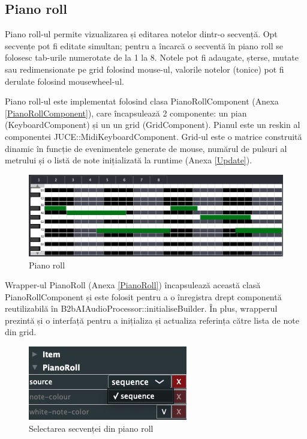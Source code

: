     \subsection{Piano roll}
        \noindent Piano roll-ul permite vizualizarea și editarea notelor dintr-o secvență. Opt secvențe pot fi editate simultan; pentru a încarcă o secventă în piano roll se folosesc tab-urile numerotate de la 1 la 8. Notele pot fi adaugate, șterse,  mutate sau redimensionate pe grid folosind mouse-ul, valorile notelor (tonice) pot fi derulate folosind mousewheel-ul. \par
        Piano roll-ul este implementat folosind clasa PianoRollComponent (Anexa \ref{PianoRollComponent}), care încapsulează 2 componente: un pian (KeyboardComponent) și un un grid (GridComponent). Pianul este un reskin al componentei JUCE::MidiKeyboardComponent. Grid-ul este o matrice construită dinamic în funcție de evenimentele generate de mouse, numărul de pulsuri al metrului și o listă de note inițializată la runtime (Anexa \ref{Update}). \par 
                \begin{figure}[H]
            \centering
            \includegraphics[scale=0.428]{images/pianoroll.jpeg}
            \caption{Piano roll}
            \label{fig:piano_rol}
        \end{figure}
        \noindent Wrapper-ul PianoRoll (Anexa \ref{PianoRoll}) încapsulează această clasă PianoRollComponent și este folosit pentru a o înregistra drept componentă reutilizabilă în B2bAIAudioProcessor::initialiseBuilder. În plus, wrapperul prezintă și o interfață pentru a inițializa și actualiza referința către lista de note din grid. \par
        
        \begin{figure}[H]
            \centering
            \includegraphics[scale=0.6]{images/interface.jpeg}
            \caption{Selectarea secvenței din piano roll}
            \label{fig:interface}
        \end{figure}
        
